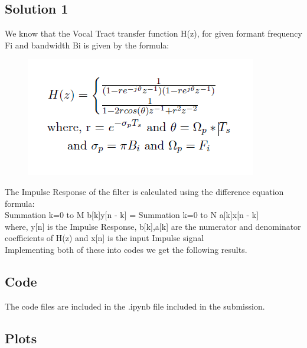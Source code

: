 \documentclass{article}
\begin{document}
\subsection{Solution 1}

We know that the Vocal Tract transfer function H(z), for given formant frequency Fi and bandwidth Bi is given by the formula:

\begin{figure}[H]
\begin{center}
\includegraphics[scale = 0.8]{H.png}
\end{center}
\end{figure}

The Impulse Response of the filter is calculated using the difference equation formula:\\
Summation k=0 to M b[k]y[n - k] = Summation k=0 to N a[k]x[n - k] \\
where, y[n] is the Impulse Response, b[k],a[k] are the numerator and denominator coefficients of H(z) and x[n] is the input Impulse signal\\

Implementing both of these into codes we get the following results.



\subsection{Code}
The code files are included in the .ipynb file included in the submission.

\subsection{Plots}
\end{document}
